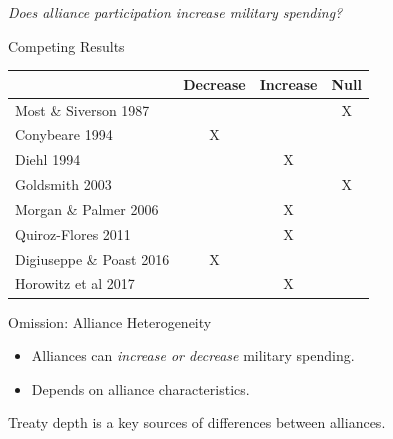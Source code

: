 \documentclass[12pt]{beamer}
\begin{document}

\begin{frame}[standout]

\huge \textit{Does alliance participation increase military spending?} 

 \end{frame}


\begin{frame}{Competing Results}

\begin{table}[hbt!]
\begin{center}
\begin{tabular}{lccc}
     & Decrease & Increase & Null \\
\hline
Most \& Siverson 1987  &  &  & X \\
Conybeare 1994 & X & &  \\
Diehl 1994 &  & X &  \\
Goldsmith 2003 &  &  & X \\
Morgan \& Palmer 2006 &  & X & \\ 
Quiroz-Flores 2011 &  & X &  \\ 
Digiuseppe \& Poast 2016 & X &  & \\ 
Horowitz et al 2017 &  & X & \\ 
\hline
\end{tabular}
\end{center} 
\end{table}


 \end{frame}


\begin{frame}{Omission: Alliance Heterogeneity}


\begin{itemize}
\item Alliances can \textit{increase or decrease} military spending. 
\pause
\item Depends on alliance characteristics. 
\end{itemize} 

\end{frame}

 \begin{frame}[standout]

Treaty depth is a key sources of differences between alliances. 

 \end{frame}
\end{document}
